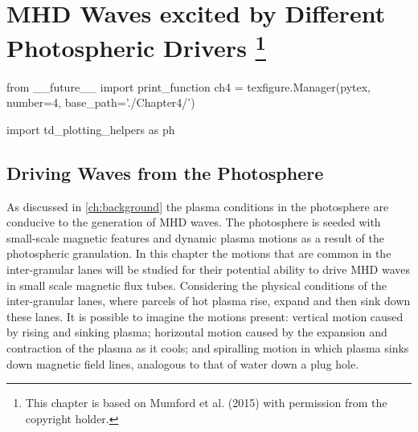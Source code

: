 
\chapter[MHD Waves excited by Different Photospheric Drivers]{MHD Waves excited by Different Photospheric Drivers \footnote{This chapter is based on Mumford et al. (2015) with permission from the copyright holder.}}\label{ch:drivers}

\begin{pycode}[chapter4]
from __future__ import print_function
ch4 = texfigure.Manager(pytex, number=4, base_path='./Chapter4/')

import td_plotting_helpers as ph
\end{pycode}

\section{Driving Waves from the Photosphere}\label{sec:5drivers}

As discussed in \cref{ch:background} the plasma conditions in the photosphere are conducive to the generation of MHD waves.
The photosphere is seeded with small-scale magnetic features and dynamic plasma motions as a result of the photospheric granulation.
In this chapter the motions that are common in the inter-granular lanes will be studied for their potential ability to drive MHD waves in small scale magnetic flux tubes.
Considering the physical conditions of the inter-granular lanes, where parcels of hot plasma rise, expand and then sink down these lanes.
It is possible to imagine the motions present: vertical motion caused by rising and sinking plasma; horizontal motion caused by the expansion and contraction of the plasma as it cools; and spiralling motion in which plasma sinks down magnetic field lines, analogous to that of water down a plug hole.

